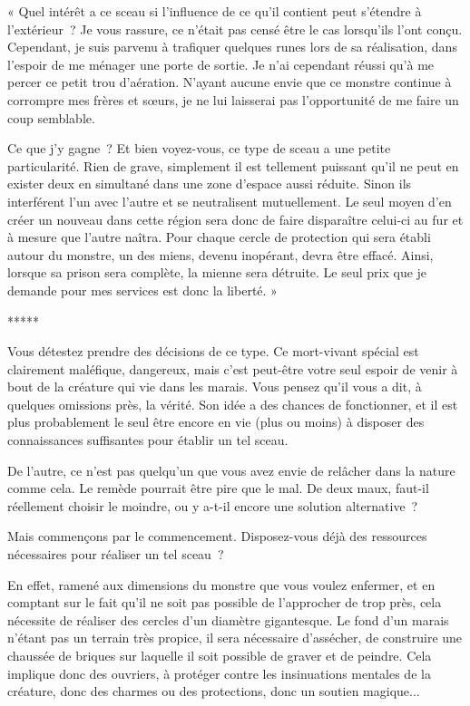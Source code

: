 \documentclass{report}
\newcommand{\ellipse}{
    \begin{center}
        *****
    \end{center}
}
\begin{document}
« Quel intérêt a ce sceau si l'influence de ce qu'il contient peut s'étendre à l'extérieur ? Je vous rassure, ce n'était pas censé être le cas lorsqu'ils l'ont conçu. Cependant, je suis parvenu à trafiquer quelques runes lors de sa réalisation, dans l'espoir de me ménager une porte de sortie. Je n'ai cependant réussi qu'à me percer ce petit trou d'aération. N'ayant aucune envie que ce monstre continue à corrompre mes frères et sœurs, je ne lui laisserai pas l'opportunité de me faire un coup semblable.

Ce que j'y gagne ? Et bien voyez-vous, ce type de sceau a une petite particularité. Rien de grave, simplement il est tellement puissant qu'il ne peut en exister deux en simultané dans une zone d'espace aussi réduite. Sinon ils interférent l'un avec l'autre et se neutralisent mutuellement. Le seul moyen d'en créer un nouveau dans cette région sera donc de faire disparaître celui-ci au fur et à mesure que l'autre naîtra. Pour chaque cercle de protection qui sera établi autour du monstre, un des miens, devenu inopérant, devra être effacé. Ainsi, lorsque sa prison sera complète, la mienne sera détruite. Le seul prix que je demande pour mes services est donc la liberté. »

\ellipse

Vous détestez prendre des décisions de ce type. Ce mort-vivant spécial est clairement maléfique, dangereux, mais c'est peut-être votre seul espoir de venir à bout de la créature qui vie dans les marais. Vous pensez qu'il vous a dit, à quelques omissions près, la vérité. Son idée a des chances de fonctionner, et il est plus probablement le seul être encore en vie (plus ou moins) à disposer des connaissances suffisantes pour établir un tel sceau.

De l'autre, ce n'est pas quelqu'un que vous avez envie de relâcher dans la nature comme cela. Le remède pourrait être pire que le mal. De deux maux, faut-il réellement choisir le moindre, ou y a-t-il encore une solution alternative ?

Mais commençons par le commencement. Disposez-vous déjà des ressources nécessaires pour réaliser un tel sceau ?

En effet, ramené aux dimensions du monstre que vous voulez enfermer, et en comptant sur le fait qu'il ne soit pas possible de l'approcher de trop près, cela nécessite de réaliser des cercles d'un diamètre gigantesque. Le fond d'un marais n'étant pas un terrain très propice, il sera nécessaire d'assécher, de construire une chaussée de briques sur laquelle il soit possible de graver et de peindre. Cela implique donc des ouvriers, à protéger contre les insinuations mentales de la créature, donc des charmes ou des protections, donc un soutien magique...
\end{document}
